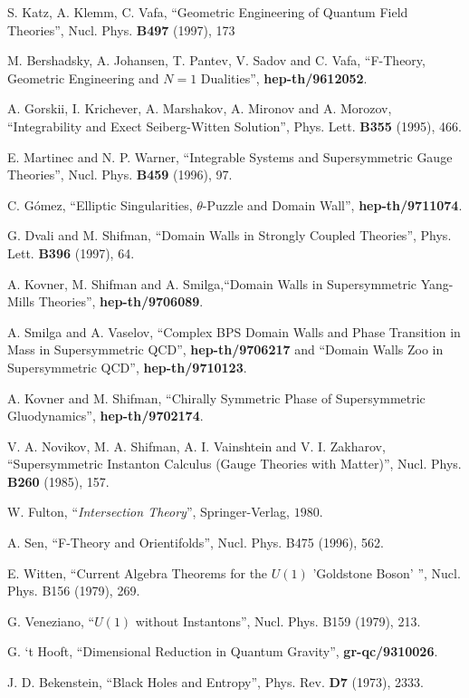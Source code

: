 \begin{thebibliography}{99}
 S. Katz, A. Klemm, C. Vafa, ``Geometric Engineering of Quantum Field Theories'', Nucl. Phys. {\bf B497} (1997), 173

 M. Bershadsky, A. Johansen, T. Pantev, V. Sadov and C. Vafa, 
``F-Theory, Geometric Engineering and $N\!=\!1$ Dualities'', {\bf hep-th/9612052}.

 A. Gorskii, I. Krichever, A. Marshakov, A. Mironov
and A. Morozov, ``Integrability and Exect Seiberg-Witten Solution'', 
Phys. Lett. {\bf B355} (1995), 466.

 E. Martinec and N. P. Warner, ``Integrable Systems and Supersymmetric 
Gauge Theories'', Nucl. Phys. {\bf B459} (1996), 97.

 C. G\'omez, ``Elliptic Singularities,
$\theta$-Puzzle and Domain Wall'', {\bf hep-th/9711074}.

 G. Dvali and M. Shifman, ``Domain Walls in 
Strongly Coupled Theories'', Phys. Lett. {\bf B396} (1997), 64.

 A. Kovner, M. Shifman and A. Smilga,``Domain Walls in Supersymmetric 
Yang-Mills Theories'', {\bf hep-th/9706089}.

 A. Smilga and A. Vaselov, ``Complex BPS 
Domain Walls and Phase Transition in Mass in Supersymmetric QCD'', {\bf hep-th/9706217} 
and ``Domain Walls Zoo in Supersymmetric QCD'', {\bf hep-th/9710123}.

 A. Kovner and M. Shifman, ``Chirally Symmetric Phase of
Supersymmetric Gluodynamics'', {\bf hep-th/9702174}.

 V. A. Novikov, M. A. Shifman, A. I. Vainshtein and V. I. Zakharov, 
``Supersymmetric Instanton Calculus (Gauge
Theories with Matter)'', Nucl. Phys. {\bf B260} (1985), 157.

 W. Fulton, ``{\em Intersection Theory}'',
Springer-Verlag, $1980$.

 A. Sen, ``F-Theory and Orientifolds'', 
Nucl. Phys. B475 (1996), 562.

 E. Witten, ``Current Algebra Theorems for 
the $U(1)$ 'Goldstone Boson' '', Nucl. Phys. B156 (1979), 269.

 G. Veneziano, ``$U(1)$ without Instantons'', Nucl. Phys. B159 (1979), 213.

 G. `t Hooft, ``Dimensional Reduction in Quantum
Gravity'', {\bf gr-qc/9310026}.

 J. D. Bekenstein, ``Black Holes and
Entropy'', Phys. Rev. {\bf D7} (1973), 2333.


\end{thebibliography}

